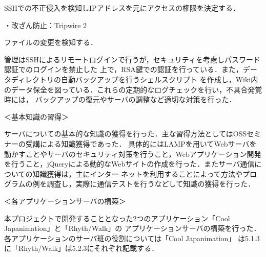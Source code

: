 \par SSHでの不正侵入を検知しIPアドレスを元にアクセスの権限を決定する．
\par ・改ざん防止：Tripwire 2
\par ファイルの変更を検知する．
\\
\par
管理はSSHによるリモートログインで行うが，セキュリティを考慮しパスワード認証でのログインを禁止した
上で，RSA鍵での認証を行っている．また，データディレクトリの自動バックアップを行うシェルスクリプト
を作成し，Wiki内のデータ保全を図っている．これらの定期的なログチェックを行い，不具合発覚時には，
バックアップの復元やサーバの調整など適切な対策を行った．
\\
\par ＜基本知識の習得＞
\par
サーバについての基本的な知識の獲得を行った．主な習得方法としてはOSSセミナーの受講による知識獲得であった．
具体的にはLAMPを用いてWebサーバを動かすことやサーバのセキュリティ対策を行うこと，Webアプリケーション開発
を行うこと，jQueryによる動的なWebサイトの作成を行った．またサーバ通信についての知識獲得は，主にインター
ネットを利用することによって方法やプログラムの例を調査し，実際に通信テストを行うなどして知識の獲得を行った．
\\
\par ＜各アプリケーションサーバの構築＞
\par
本プロジェクトで開発することとなった2つのアプリケーション「Cool Japanimation」と「Rhyth/Walk」の
アプリケーションサーバの構築を行った．各アプリケーションのサーバ班の役割については「Cool Japanimation」
は5.1.3に「Rhyth/Walk」は5.2.3にそれぞれ記載する．
